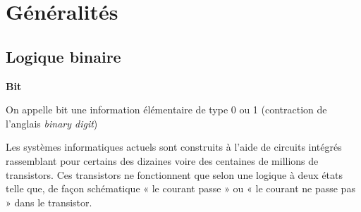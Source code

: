 \documentclass[10pt,fleqn]{article} %
\begin{document}









\section{Généralités \cite{cf}}

\subsection{Logique binaire}


\begin{defi}
\textbf{Bit}

On appelle bit une information élémentaire de type 0 ou 1 (contraction de l'anglais \textit{binary digit})

\end{defi}

Les systèmes informatiques actuels sont construits à l’aide de circuits intégrés rassemblant pour certains des dizaines voire des centaines de millions de transistors. Ces transistors ne fonctionnent que selon une logique à deux états telle que, de façon schématique « le courant passe » ou « le courant ne passe pas » dans le transistor. 
\end{document}
